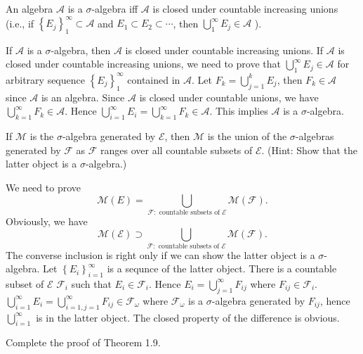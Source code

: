 \begin{exe}
  An algebra $\mathcal{A}$ is a $\sigma$-algebra iff $\mathcal{A}$ is closed under countable increasing unions (i.e., if $\left\{ E_j \right\}_{1}^{\infty}\subset \mathcal{A}$ and $E_1\subset E_2\subset \cdots$, then $\bigcup_{1} ^{\infty}E_j\in \mathcal{A}$ ).
\end{exe}
\begin{sol}
  If $\mathcal{A}$ is a $\sigma$-algebra, then $\mathcal{A}$ is closed under countable increasing unions. If $\mathcal{A}$ is closed under countable increasing unions, we need to prove that $\bigcup_{1} ^{\infty}E_j\in \mathcal{A}$ for arbitrary sequence $\left\{ E_j \right\}_{1}^{\infty}$ contained in $\mathcal{A}$. Let $F_k=\bigcup_{j=1} ^{k}E_{j}$, then $F_k\in \mathcal{A}$ since $\mathcal{A}$ is an algebra. Since $\mathcal{A}$ is closed under countable unions, we have $\bigcup_{k=1} ^{\infty}F_k\in \mathcal{A}$. Hence $\bigcup_{i=1} ^{\infty}E_i=\bigcup_{k=1} ^{\infty}F_k\in \mathcal{A}$. This implies $\mathcal{A}$ is a $\sigma$-algebra.
\end{sol}
\begin{exe}
  If $\mathcal{M}$ is the $\sigma$-algebra generated by $\mathcal{E}$, then $\mathcal{M}$ is the union of the $\sigma$-algebras generated by $\mathcal{F}$ as $\mathcal{F}$ ranges over all countable subsets of $\mathcal{E}$. (Hint: Show that the latter object is a $\sigma$-algebra.)
\end{exe}
\begin{sol}
  We need to prove \[
    \mathcal{M}\left( E \right) =\bigcup_{\mathcal{F}: \text{ countable subsets of } \mathcal{E}}\mathcal{M}\left( \mathcal{F} \right)
  .\] 
  Obviously, we have
  \[
    \mathcal{M}\left( \mathcal{E} \right) \supset \bigcup_{\mathcal{F}: \text{ countable subsets of } \mathcal{E}} \mathcal{M}\left( \mathcal{F} \right)
  .\]
  The converse inclusion is right only if  we can show the latter object is a $\sigma$-algebra. Let  $\left\{ E_i \right\}_{i=1}^{\infty}$ is a sequnce of the latter  object. There is a countable subset of $\mathcal{E}$ $\mathcal{F}_i$ such that $E_i\in \mathcal{F}_i$. Hence $E_i=\bigcup_{j=1} ^{\infty}F_{ij}$ where $F_{ij}\in \mathcal{F}_i$. $\bigcup_{i=1} ^{\infty}E_i=\bigcup_{i=1,j=1} ^{\infty}F_{ij}\in \mathcal{F}_{\omega}$ where $\mathcal{F}_{\omega}$ is a $\sigma$-algebra generated by $F_{ij}$, hence $\bigcup_{i=1} ^{\infty}$ is in the latter object. The closed property of the difference is obvious.
\end{sol}
\begin{exe}
  Complete the proof of Theorem 1.9.	
\end{exe}
